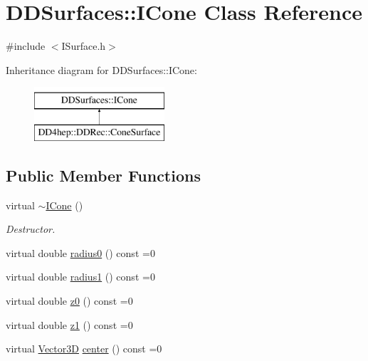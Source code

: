\hypertarget{class_d_d_surfaces_1_1_i_cone}{}\section{D\+D\+Surfaces\+:\+:I\+Cone Class Reference}
\label{class_d_d_surfaces_1_1_i_cone}


{\ttfamily \#include $<$I\+Surface.\+h$>$}

Inheritance diagram for D\+D\+Surfaces\+:\+:I\+Cone\+:\begin{figure}[H]
\begin{center}
\leavevmode
\includegraphics[height=2.000000cm]{class_d_d_surfaces_1_1_i_cone}
\end{center}
\end{figure}
\subsection*{Public Member Functions}
\begin{DoxyCompactItemize}
\item 
virtual \hyperlink{class_d_d_surfaces_1_1_i_cone_a7693726c5c65f892a24e244b12acbf17}{$\sim$\+I\+Cone} ()
\begin{DoxyCompactList}\small\item\em Destructor. \end{DoxyCompactList}\item 
virtual double \hyperlink{class_d_d_surfaces_1_1_i_cone_af7be60438f58e45d5e82a2d826a0a7d7}{radius0} () const =0
\item 
virtual double \hyperlink{class_d_d_surfaces_1_1_i_cone_a58fb9fc961cc2580a6cc1d5fda4d817e}{radius1} () const =0
\item 
virtual double \hyperlink{class_d_d_surfaces_1_1_i_cone_a306dd8443c146ce57ebf98f7f5c11013}{z0} () const =0
\item 
virtual double \hyperlink{class_d_d_surfaces_1_1_i_cone_a7bb86876e5f5196ea11ac78bcaa42dbc}{z1} () const =0
\item 
virtual \hyperlink{class_d_d_surfaces_1_1_vector3_d}{Vector3D} \hyperlink{class_d_d_surfaces_1_1_i_cone_a2543c4f2ec55d1ace4464652a0c89bce}{center} () const =0
\end{DoxyCompactItemize}


